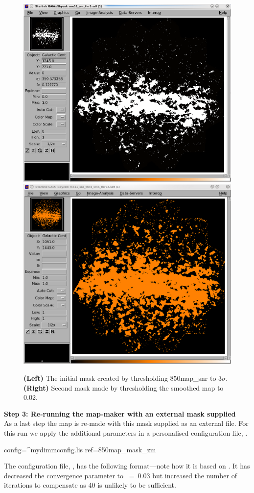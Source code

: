 \begin{figure}[t]
\includegraphics[width=0.475\linewidth]{sc21_gal_mask1}
\hspace{2mm}
\includegraphics[width=0.475\linewidth]{sc21_gal_mask2}
\caption[Galactic example: thresholded SNR map and smoothed map]{
  \textbf{(Left)} The initial mask created by thresholding 850map\_snr
  to 3$\sigma$. \textbf{(Right)} Second mask made by thresholding the
  smoothed map to 0.02.\label{fig:mask}
}
\end{figure}


\textbf{Step 3: Re-running the map-maker with an external mask supplied}
\vspace{0.2cm}\\
As a last step the map is re-made with this mask supplied as an external
file. For this run we apply the additional parameters in a
personalised configuration file, .
\begin{terminalv}
          config=^mydimmconfig.lis ref=850map_mask_zm
\end{terminalv}

The configuration file, , has the following
format---note how it is based on
. It has decreased the
convergence parameter to ~=~0.03 but increased the number
of iterations to compensate as 40 is unlikely to be sufficient.

